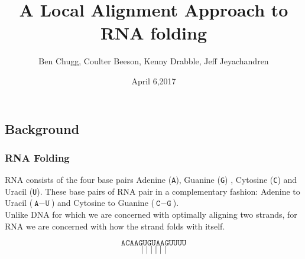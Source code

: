 \documentclass{beamer}
\title{A Local Alignment Approach to RNA folding}
\author{Ben Chugg, Coulter Beeson, Kenny Drabble, Jeff Jeyachandren}
\institute{University of British Columbia}
\date{April 6,2017}
\newcommand{\A}{\texttt{A}}
\newcommand{\G}{\texttt{G}}
\newcommand{\U}{\texttt{U}}
\newcommand{\C}{\texttt{C}}
\begin{document}
\begin{frame}
\titlepage
\end{frame}


\begin{frame}
\section*{Background}
\frametitle{RNA Folding}
RNA consists of the four base pairs Adenine (\A), Guanine (\G) , Cytosine (\C) and Uracil (\U). These base pairs of RNA pair in a complementary fashion: Adenine to Uracil ($\A-\U$) and Cytosine to Guanine ($\C-\G$). \\

Unlike DNA for which we are concerned with optimally aligning two strands, for RNA we are concerned with how the strand folds with itself. 

\[\A\C\A\A\G\U\G\U\A\A\G\U\U\U\U\]
\[|\;|\;|\;|\;|\;|\] 

\end{frame}
\end{document}
